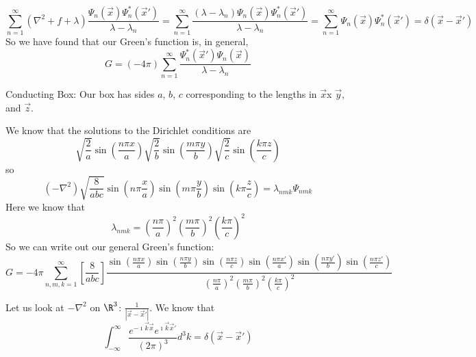 \documentclass[a4paper,twoside,master.tex]{subfiles}
\begin{document}
\begin{equation}
    \sum_{n=1}^{\infty} (\nabla^2 + f + \lambda) \frac{\Psi_n(\vec{x}) \Psi_n^*(\vec{x}')}{\lambda-\lambda_n} = \sum_{n=1}^{\infty} \frac{(\lambda-\lambda_n)\Psi_n(\vec{x})\Psi_n^*(\vec{x}')}{\lambda-\lambda_n} = \sum_{n=1}^{\infty} \Psi_n(\vec{x})\Psi_n^*(\vec{x}') = \delta(\vec{x}-\vec{x}')
\end{equation}
So we have found that our Green's function is, in general,
\begin{equation}
    G = (-4\pi) \sum_{n=1}^{\infty} \frac{\Psi_n^*(\vec{x}')\Psi_n(\vec{x})}{\lambda-\lambda_n}
\end{equation}
\begin{ex}
    Conducting Box:
    Our box has sides $a$, $b$, $c$ corresponding to the lengths in $\vec{x}$x $\vec{y}$, and $\vec{z}$.

    We know that the solutions to the Dirichlet conditions are
    \begin{equation}
        \sqrt{\frac{2}{a}}\sin\left( \frac{n\pi x}{a} \right) \sqrt{\frac{2}{b}}\sin\left( \frac{m\pi y}{b} \right) \sqrt{\frac{2}{c}}\sin\left( \frac{k\pi z}{c} \right)
    \end{equation}
    so
    \begin{equation}
        (-\nabla^2)\sqrt{\frac{8}{abc}}\sin\left( n\pi \frac{x}{a} \right) \sin\left( m\pi\frac{y}{b} \right) \sin\left( k\pi\frac{z}{c}\right) = \lambda_{nmk}\Psi_{nmk}
    \end{equation}
    Here we know that
    \begin{equation}
        \lambda_{nmk} = \left( \frac{n\pi}{a} \right)^2 \left( \frac{m\pi}{b} \right)^2\left( \frac{k\pi}{c} \right)^2
    \end{equation}
    So we can write out our general Green's function:
    \begin{equation}
        G = -4\pi \sum_{n,m,k=1}^{\infty} \left[ \frac{8}{abc} \right] \frac{\sin\left(\frac{n\pi x}{a} \right)  \sin\left(\frac{n\pi y}{b} \right)\sin\left(\frac{n\pi z}{c} \right)  \sin\left(\frac{n\pi x'}{a} \right)  \sin\left(\frac{n\pi y'}{b} \right)\sin\left(\frac{n\pi z'}{c} \right)}{\left( \frac{n\pi}{a} \right)^2 \left( \frac{m\pi}{b} \right)^2\left( \frac{k\pi}{c} \right)^2}
    \end{equation}
\end{ex}

Let us look at $-\nabla^2$ on $\R^3$: $\frac{1}{|\vec{x}-\vec{x}'|}$. We know that
\begin{equation}
    \int_{-\infty}^{\infty} \frac{e^{-\imath \vec{k}\vec{x}}e^{\imath \vec{k}\vec{x}'}}{(2\pi)^3}d^3k = \delta(\vec{x}-\vec{x}')
\end{equation}
\end{document}
